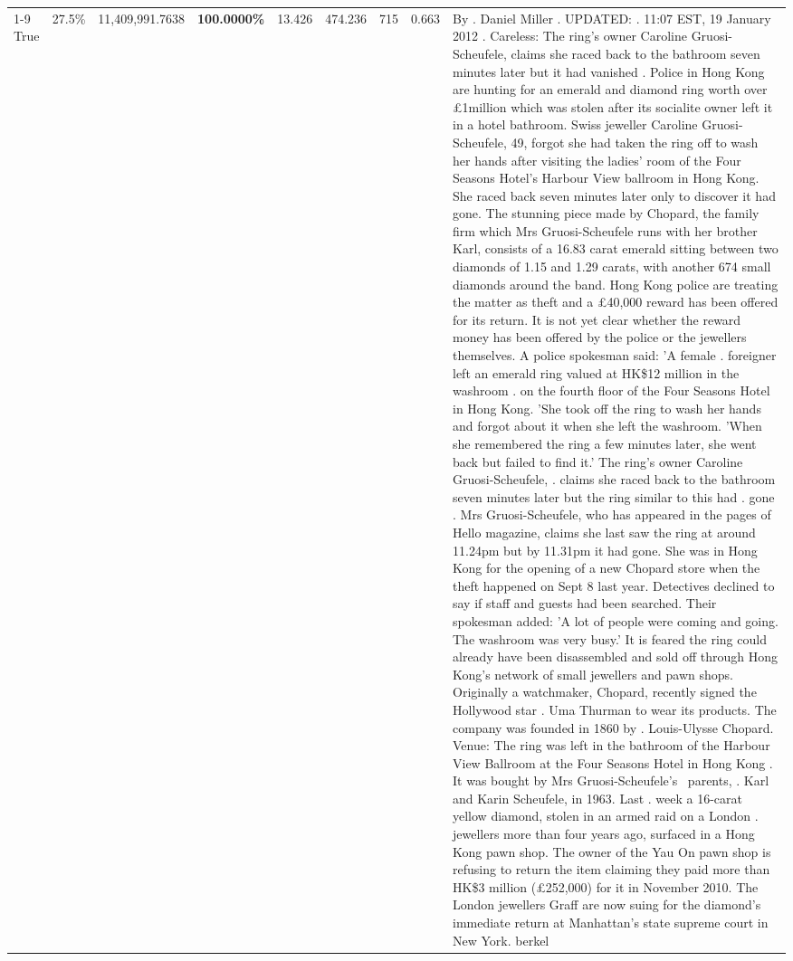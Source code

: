 \begin{table}[H]
\begin{tabular}{lllrlllll}
\cline{1-9}
True & 27.5\% & 11,409,991.7638 & \bfseries \color{red} 100.0000\% & 13.426 & 474.236 & 715 & 0.663 & By . Daniel Miller . UPDATED: . 11:07 EST, 19 January 2012 . Careless: The ring's owner Caroline Gruosi-Scheufele, claims she raced back to the bathroom seven minutes later but it had vanished . Police in Hong Kong are hunting for an emerald and diamond ring worth over £1million which was stolen after its socialite owner left it in a hotel bathroom. Swiss jeweller Caroline Gruosi-Scheufele, 49, forgot she had taken the ring off to wash her hands after visiting the ladies' room of the Four Seasons Hotel's Harbour View ballroom in Hong Kong. She raced back seven minutes later only to discover it had gone. The stunning piece made by Chopard, the family firm which Mrs Gruosi-Scheufele runs with her brother Karl, consists of a 16.83 carat emerald sitting between two diamonds of 1.15 and 1.29 carats, with another 674 small diamonds around the band. Hong Kong police are treating the matter as theft and a £40,000 reward has been offered for its return. It is not yet clear whether the reward money has been offered by the police or the jewellers themselves. A police spokesman said: 'A female . foreigner left an emerald ring valued at HK\$12 million in the washroom . on the fourth floor of the Four Seasons Hotel in Hong Kong. 'She took off the ring to wash her hands and forgot about it when she left the washroom. 'When she remembered the ring a few minutes later, she went back but failed to find it.' The ring's owner Caroline Gruosi-Scheufele, . claims she raced back to the bathroom seven minutes later but the ring similar to this had . gone . Mrs Gruosi-Scheufele, who has appeared in the pages of Hello magazine, claims she last saw the ring at around 11.24pm but by 11.31pm it had gone. She was in Hong Kong for the opening of a new Chopard store when the theft happened on Sept 8 last year. Detectives declined to say if staff and guests had been searched. Their spokesman added: 'A lot of people were coming and going. The washroom was very busy.' It is feared the ring could already have been disassembled and sold off through Hong Kong's network of small jewellers and pawn shops. Originally a watchmaker, Chopard, recently signed the Hollywood star . Uma Thurman to wear its products. The company was founded in 1860 by . Louis-Ulysse Chopard. Venue: The ring was left in the bathroom of the Harbour View Ballroom at the Four Seasons Hotel in Hong Kong . It was bought by Mrs Gruosi-Scheufele's  parents, . Karl and Karin Scheufele, in 1963. Last . week a 16-carat yellow diamond, stolen in an armed raid on a London . jewellers more than four years ago, surfaced in a Hong Kong pawn shop. The owner of the Yau On pawn shop is refusing to return the item claiming they paid more than HK\$3 million (£252,000) for it in November 2010. The London jewellers Graff are now suing for the diamond’s immediate return at Manhattan’s state supreme court in New York. berkel \\

\end{tabular}
\end{table}
